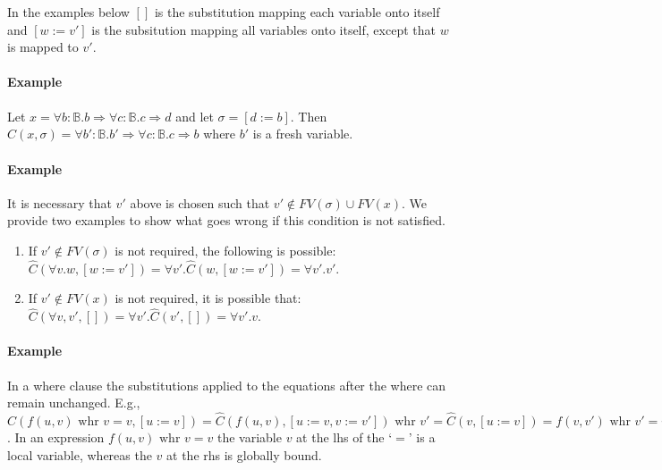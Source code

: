 \documentclass{article}
\newcommand{\Bool}{\mathbb{B}}
\begin{document}
In the examples below $[]$ is the substitution mapping each variable onto itself and $[w:=v']$ is the subsitution
mapping all variables onto itself, except that $w$ is mapped to $v'$.

\paragraph{Example}
Let $x=\forall b{:} \Bool.b\Rightarrow \forall c{:}\Bool.c\Rightarrow d$ and let $\sigma=[d:=b]$. Then
$\hat{C}(x,\sigma)=\forall b'{:}\Bool.b'\Rightarrow\forall c{:}\Bool.c\Rightarrow b$ where $b'$ is a fresh 
variable.

\paragraph{Example}
It is necessary that $v'$ above is chosen such that $v'\notin \mathit{FV}(\sigma)\cup\mathit{FV}(x)$.
We provide two examples to show what goes wrong if this condition is not satisfied. 
\begin{enumerate}
\item
If $v'\notin \mathit{FV}(\sigma)$ is not required, the following is possible: $\hat{C}(\forall v.w,[w:=v'])=\forall
v'.\hat{C}(w,[w:=v'])=\forall v'.v'$.
\item
If $v'\notin \mathit{FV}(x)$ is not required, it is possible that: $\hat{C}(\forall v,v',[])=\forall v'.\hat{C}(v',[])=\forall v'.v$. 
\end{enumerate}
\paragraph{Example}
In a where clause the substitutions applied to the equations after the where can remain unchanged.
E.g., $\hat{C}(f(u,v)\text{ whr }v=v,[u:=v])=\hat{C}(f(u,v),[u:=v,v:=v'])\text{ whr }v'=\hat{C}(v,[u:=v])=f(v,v')\text{ whr }
v'=v$. In an expression $f(u,v)\text{ whr }v=v$ the variable $v$ at the lhs of the `$=$' is a local variable,
whereas the $v$ at the rhs is globally bound. 
\end{document}
